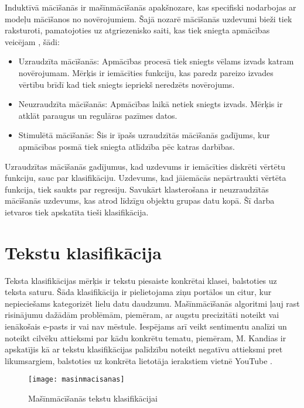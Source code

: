 Induktīvā mācīšanās ir mašīnmācīšanās apakšnozare, kas specifiski nodarbojas ar modeļu mācīšanos no novērojumiem. Šajā nozarē mācīšanās uzdevumi bieži tiek raksturoti, pamatojoties uz atgriezenisko saiti, kas tiek sniegta apmācības veicējam \cite{russel2010}, šādi:

\begin{itemize}
\item Uzraudzīta mācīšanās: Apmācības procesā tiek sniegts vēlams izvads katram novērojumam. Mērķis ir iemācīties funkciju, kas paredz pareizo izvades vērtību brīdī kad tiek sniegts iepriekš neredzēts novērojums.
\item Neuzraudzīta mācīšanās: Apmācības laikā netiek sniegts izvads. Mērķis ir atklāt paraugus un regulāras pazīmes datos.
\item Stimulētā mācīšanās: Šis ir īpašs uzraudzītās mācīšanās gadījums, kur apmācības posmā tiek sniegta atlīdzība pēc katras darbības.
\end{itemize}

Uzraudzītas mācīšanās gadījumus, kad uzdevums ir iemācīties diskrēti vērtētu funkciju, sauc par klasifikāciju. Uzdevums, kad jāiemācās nepārtraukti vērtēta funkcija, tiek saukts par regresiju. Savukārt klasterošana ir neuzraudzītās mācīšanās uzdevums, kas atrod līdzīgu objektu grupas datu kopā. Šī darba ietvaros tiek apskatīta tieši klasifikācija.

\section{Tekstu klasifikācija}

Teksta klasifikācijas mērķis ir tekstu piesaiste konkrētai klasei, balstoties uz teksta saturu. Šāda klasifikācija ir pielietojama ziņu portālos un citur, kur nepieciešams kategorizēt lielu datu daudzumu. Mašīnmācīšanās algoritmi ļauj rast risinājumu dažādām problēmām, piemēram, ar augstu precizitāti noteikt vai ienākošais e-pasts ir vai nav mēstule. Iespējams arī veikt sentimentu analīzi un noteikt cilvēku attieksmi par kādu konkrētu tematu, piemēram, M. Kandias ir apskatījis kā ar tekstu klasifikācijas palīdzību noteikt negatīvu attieksmi pret likumsargiem, balstoties uz konkrēta lietotāja ierakstiem vietnē YouTube \cite{threatdetectionyoutube}.

\begin{figure}[H]
	\texttt{[image: masinmacisanas]}
	\caption{Mašīnmācīšanās tekstu klasifikācijai}
	\label{fig:masinmacisanas}
\end{figure}

